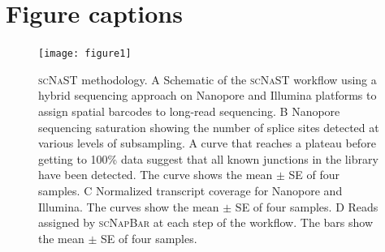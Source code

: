 \documentclass[utf8]{FrontiersinHarvard} %
\newcommand{\scn}{\textsc{scNapBar}\xspace}
\newcommand{\scnast}{\textsc{scNaST}\xspace}
\begin{document}
%




\section*{Figure captions}


\begin{figure}[h!]
\begin{center}
\texttt{[image: figure1]}
\end{center}
\caption{\scnast methodology. A Schematic of the \scnast workflow using a hybrid sequencing approach on Nanopore and Illumina platforms to assign spatial barcodes to long-read sequencing. B Nanopore sequencing saturation showing the number of splice sites detected at various levels of subsampling. A curve that reaches a plateau before getting to 100\% data suggest that all known junctions in the library have been detected. The curve shows the mean $\pm$ SE of four samples. C Normalized transcript coverage for Nanopore and Illumina. The curves show the mean $\pm$ SE of four samples. D Reads assigned by \scn at each step of the workflow. The bars show the mean $\pm$ SE of four samples.}\label{fig:1}
\end{figure}
\end{document}
